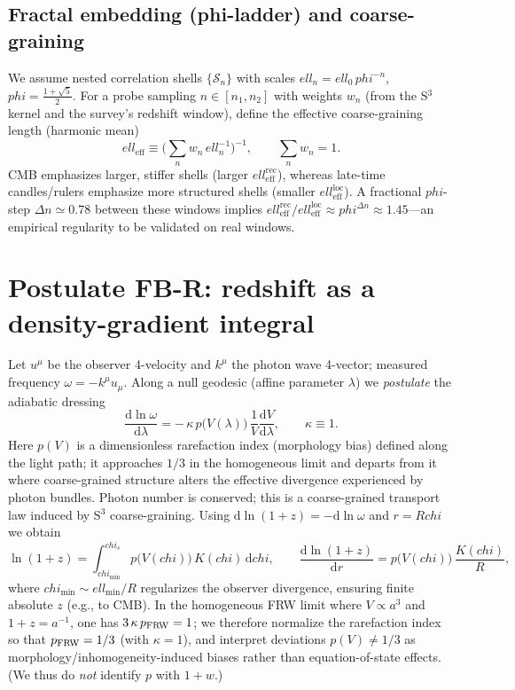 \documentclass[
  onecolumn,
  amsmath,amssymb,
  aps,
  prd,
  superscriptaddress,
  nofootinbib,
  longbibliography
]{revtex4-2}
\newcommand{\vp}{\varphi}
\newcommand{\ellEff}{\ell_{\mathrm{eff}}}
\newcommand{\ellRec}{\ell_{\mathrm{eff}}^{\mathrm{rec}}}
\newcommand{\ellLoc}{\ell_{\mathrm{eff}}^{\mathrm{loc}}}
\def\texorpdfstring#1#2{#2}%
\def\varphi{phi}%
\def\chi{chi}%
\def\ell{ell}%
\begin{document}
\subsection{Fractal embedding (\texorpdfstring{$\vp$}{phi}-ladder) and coarse-graining}
We assume nested correlation shells $\{\mathcal{S}_n\}$ with scales $\ell_n=\ell_0\,\vp^{-n}$, $\vp=\tfrac{1+\sqrt5}{2}$.
For a probe sampling $n\in[n_1,n_2]$ with weights $w_n$ (from the S$^3$ kernel and the survey's redshift window), define the effective coarse-graining length (harmonic mean)
\begin{equation}
\label{eq:ell_eff}
\ellEff\equiv\Big(\sum_{n} w_n\,\ell_n^{-1}\Big)^{-1},\qquad \sum_n w_n=1.
\end{equation}
CMB emphasizes larger, stiffer shells (larger $\ellRec$), whereas late-time candles/rulers emphasize more structured shells (smaller $\ellLoc$). A fractional $\vp$-step $\Delta n\simeq 0.78$ between these windows implies $\ellRec/\ellLoc\approx \vp^{\Delta n}\approx 1.45$—an empirical regularity to be validated on real windows.

\section{Postulate FB-R: redshift as a density-gradient integral}
Let $u^\mu$ be the observer 4-velocity and $k^\mu$ the photon wave 4-vector; measured frequency $\omega=-k^\mu u_\mu$. Along a null geodesic (affine parameter $\lambda$) we \emph{postulate} the adiabatic dressing
\begin{equation}
\label{eq:transport}
\frac{\mathrm{d}\ln \omega}{\mathrm{d}\lambda}
= -\,\kappa\,p\!\big(V(\lambda)\big)\,\frac{1}{V}\frac{\mathrm{d} V}{\mathrm{d}\lambda},\qquad \kappa\equiv 1.
\end{equation}
Here $p(V)$ is a dimensionless rarefaction index (morphology bias) defined along the light path; 
it approaches $1/3$ in the homogeneous limit and departs from it where coarse-grained structure 
alters the effective divergence experienced by photon bundles. Photon number is conserved; this is a coarse-grained transport law induced by S$^3$ coarse-graining. Using $\mathrm{d}\ln(1+z)=-\mathrm{d}\ln\omega$ and $r=R\chi$ we obtain
\begin{equation}
\label{eq:ln1pz}
\ln(1+z)=\int_{\chi_{\min}}^{\chi_s}\! p\!\big(V(\chi)\big)\,K(\chi)\,\mathrm{d}\chi,\qquad
\frac{\mathrm{d}\ln(1+z)}{\mathrm{d} r}=p\!\big(V(\chi)\big)\,\frac{K(\chi)}{R},
\end{equation}
where $\chi_{\min} \sim \ell_{\min}/R$ regularizes the observer divergence, ensuring finite absolute $z$ (e.g., to CMB). In the homogeneous FRW limit where $V\propto a^3$ and $1+z=a^{-1}$, one has $3\,\kappa\,p_{\rm FRW}=1$; we therefore normalize the rarefaction index so that $p_{\rm FRW}=1/3$ (with $\kappa=1$), and interpret deviations $p(V)\neq 1/3$ as morphology/inhomogeneity-induced biases rather than equation-of-state effects. (We thus do \emph{not} identify $p$ with $1+w$.)
\end{document}
